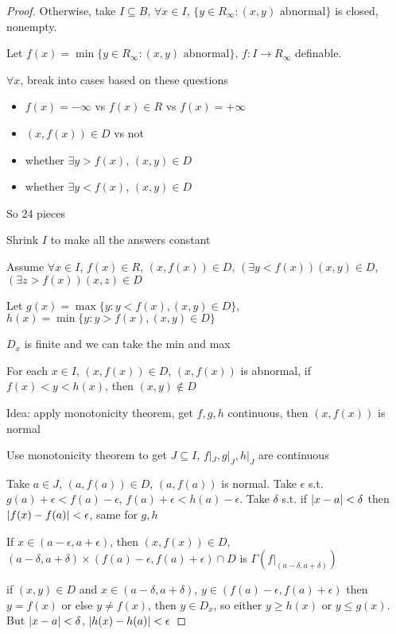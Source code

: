 \documentclass[11pt]{article}
\begin{document}
\begin{proof}
Otherwise, take \(I\subseteq B\), \(\forall x\in I\), \(\{y\in R_\infty:(x,y)\text{ abnormal}\}\) is closed, nonempty.

Let \(f(x)=\min\{y\in R_\infty:(x,y)\text{ abnormal}\}\), \(f:I\to R_\infty\) definable.

\(\forall x\), break into cases based on these questions
\begin{itemize}
\item \(f(x)=-\infty\) vs \(f(x)\in R\) vs \(f(x)=+\infty\)
\item \((x,f(x))\in D\) vs not
\item whether \(\exists y>f(x)\), \((x,y)\in D\)
\item whether \(\exists y<f(x)\), \((x,y)\in D\)
\end{itemize}

So 24 pieces

Shrink \(I\) to make all the answers constant

Assume \(\forall x\in I\), \(f(x)\in R\), \((x,f(x))\in D\), \((\exists y<f(x))(x,y)\in D\), \((\exists z>f(x))(x,z)\in D\)

Let \(g(x)=\max\{y:y<f(x), (x,y)\in D\}\), \(h(x)=\min\{y:y>f(x),(x,y)\in D\}\)

\(D_x\) is finite and we can take the min and max

For each \(x\in I\), \((x,f(x))\in D\), \((x,f(x))\) is abnormal, if \(f(x)<y<h(x)\),
then \((x,y)\notin D\)

Idea: apply monotonicity theorem, get \(f,g,h\) continuous, then \((x,f(x))\) is normal

Use monotonicity theorem to get \(J\subseteq I\), \(f|_J,g|_J,h|_J\) are continuous

Take \(a\in J\), \((a,f(a))\in D\), \((a,f(a))\) is normal. Take \(\epsilon\)
s.t. \(g(a)+\epsilon<f(a)-\epsilon\), \(f(a)+\epsilon<h(a)-\epsilon\). Take \(\delta\) s.t. if \(\abs{x-a}<\delta\)
then \(\abs{f(x)-f(a)}<\epsilon\), same for \(g,h\)

If \(x\in(a-\epsilon,a+\epsilon)\), then \((x,f(x))\in D\), \((a-\delta,a+\delta)\times(f(a)-\epsilon,f(a)+\epsilon)\cap D\)
is \(\Gamma(f|_{(a-\delta,a+\delta)})\)

if \((x,y)\in D\) and \(x\in(a-\delta,a+\delta)\), \(y\in(f(a)-\epsilon,f(a)+\epsilon)\) then \(y=f(x)\) or else \(y\neq f(x)\),
then \(y\in D_x\), so either \(y\ge h(x)\) or \(y\le g(x)\). But \(\abs{x-a}<\delta\), \(\abs{h(x)-h(a)}<\epsilon\)
\end{proof}
\end{document}
